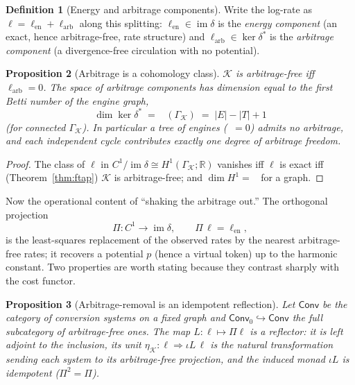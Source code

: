 \documentclass[11pt]{article}
\theoremstyle{definition}
\newtheorem{definition}{Definition}[section]
\theoremstyle{plain}
\newtheorem{proposition}[definition]{Proposition}
\theoremstyle{remark}
\newcommand{\Tok}{T}
\newcommand{\Real}{\mathbb{R}}
\newcommand{\Conv}{\mathsf{Conv}}
\newcommand{\Convf}{\mathsf{Conv}_{0}}
\newcommand{\im}{\operatorname{im}}
\DeclareMathOperator{\Betti}{b_1}
\begin{document}
\begin{definition}[Energy and arbitrage components]
Write the log-rate as $\ell=\ell_{\mathrm{en}}+\ell_{\mathrm{arb}}$ along this splitting:
$\ell_{\mathrm{en}}\in\im\delta$ is the \emph{energy component} (an exact, hence arbitrage-free,
rate structure) and $\ell_{\mathrm{arb}}\in\ker\delta^\ast$ is the \emph{arbitrage component} (a
divergence-free circulation with no potential).
\end{definition}

\begin{proposition}[Arbitrage is a cohomology class]\label{prop:betti}
$\mathcal K$ is arbitrage-free iff $\ell_{\mathrm{arb}}=0$. The space of arbitrage components has
dimension equal to the first Betti number of the engine graph,
\[
  \dim\ker\delta^\ast \;=\; \Betti(\Gamma_{\mathcal K}) \;=\; |E|-|\Tok|+1
\]
(for connected $\Gamma_{\mathcal K}$). In particular a tree of engines
($\Betti=0$) admits no arbitrage, and each independent cycle contributes exactly one degree of
arbitrage freedom.
\end{proposition}

\begin{proof}
The class of $\ell$ in $C^1/\im\delta\cong H^1(\Gamma_{\mathcal K};\Real)$ vanishes iff $\ell$ is
exact iff (Theorem~\ref{thm:ftap}) $\mathcal K$ is arbitrage-free; and
$\dim H^1=\Betti$ for a graph.
\end{proof}

Now the operational content of ``shaking the arbitrage out.'' The orthogonal projection
\[
  \Pi:C^1\longrightarrow \im\delta,\qquad \Pi\,\ell=\ell_{\mathrm{en}},
\]
is the least-squares replacement of the observed rates by the nearest arbitrage-free rates; it
recovers a potential $p$ (hence a virtual token) up to the harmonic constant. Two properties are
worth stating because they contrast sharply with the cost functor.

\begin{proposition}[Arbitrage-removal is an idempotent reflection]\label{prop:reflect}
Let $\Conv$ be the category of conversion systems on a fixed graph and $\Convf\hookrightarrow\Conv$
the full subcategory of arbitrage-free ones. The map $L:\ell\mapsto\Pi\ell$ is a reflector: it is
left adjoint to the inclusion, its unit $\eta_{\mathcal K}:\ell\Rightarrow \iota L\,\ell$ is the
natural transformation sending each system to its arbitrage-free projection, and the induced monad
$\iota L$ is \emph{idempotent} ($\Pi^2=\Pi$).
\end{proposition}
\end{document}
